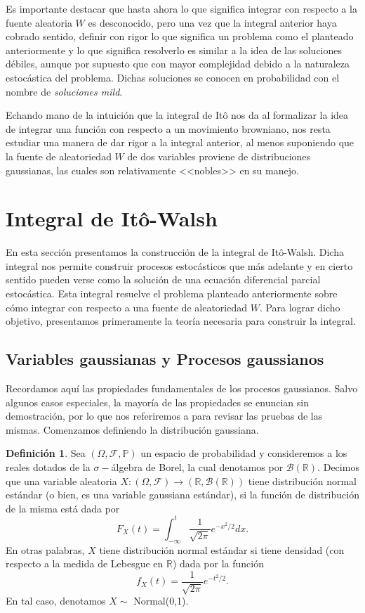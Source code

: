 \documentclass[letterpaper,twoside,12pt]{book}
\newcommand{\R}{\mathbb{R}}
\newcommand{\F}{\mathcal{F}}
\newcommand{\B}{\mathcal{B}}
\renewcommand{\P}{\mathbb{P}}
\newcommand{\1}{\mathds{1}}
\renewcommand{\to}{\rightarrow}
\theoremstyle{definition}
\newtheorem{dfn}{Definición}
\theoremstyle{definition}
\theoremstyle{remark}
\theoremstyle{definition}
\theoremstyle{definition}
\theoremstyle{definition}
\theoremstyle{definition}
\theoremstyle{definition}
\begin{document}
Es importante destacar que hasta ahora lo que significa integrar con respecto a la fuente aleatoria $W$ es desconocido, pero una vez que la integral anterior haya cobrado sentido, definir con rigor lo que significa un problema como el planteado anteriormente y lo que significa resolverlo es similar a la idea de las soluciones débiles, aunque por supuesto que con mayor complejidad debido a la naturaleza estocástica del problema. Dichas soluciones se conocen en probabilidad con el nombre de \textit{soluciones mild}.

Echando mano de la intuición que la integral de Itô nos da al formalizar la idea de integrar una función con respecto a un movimiento browniano, nos resta estudiar una manera de dar rigor a la integral anterior, al menos suponiendo que la fuente de aleatoriedad $W$ de dos variables proviene de distribuciones gaussianas, las cuales son relativamente <<nobles>> en su manejo. 

\section{Integral de Itô-Walsh}
En esta sección presentamos la construcción de la integral de Itô-Walsh. Dicha integral nos permite construir procesos estocásticos que más adelante y en cierto sentido pueden verse como la solución de una ecuación diferencial parcial estocástica. Esta integral resuelve el problema planteado anteriormente sobre cómo integrar con respecto a una fuente de aleatoriedad $W$. Para lograr dicho objetivo, presentamos primeramente la teoría necesaria para construir la integral.

\subsection{Variables gaussianas y Procesos gaussianos}
Recordamos aquí las propiedades fundamentales de los procesos gaussianos. Salvo algunos casos especiales, la mayoría de las propiedades se enuncian sin demostración, por lo que nos referiremos a \cite{gall2016brownian} para revisar las pruebas de las mismas. Comenzamos definiendo la distribución gaussiana.

\begin{dfn}
Sea $(\Omega, \F, \P)$ un espacio de probabilidad y consideremos a los reales dotados de la $\sigma-$álgebra de Borel, la cual denotamos por $\B(\R)$. Decimos que una variable aleatoria $X:(\Omega, \F)\to (\R,\B(\R))$ tiene distribución normal estándar (o bien, es una variable gaussiana estándar), si la función de distribución de la misma está dada por
\[
F_X(t)=\int_{-\infty}^{t}\frac{1}{\sqrt{2\pi}}e^{-x^2/2}dx.    
\]
En otras palabras, $X$ tiene distribución normal estándar si tiene densidad (con respecto a la medida de Lebesgue en $\R$) dada por la función 
\[
f_X(t)=\frac{1}{\sqrt{2\pi}}e^{-t^2/2}.
\]
En tal caso, denotamos $X\sim$ Normal(0,1).
\end{dfn}
\end{document}
